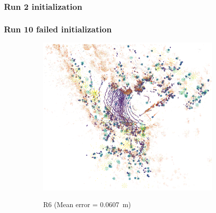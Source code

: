 \subsubsection{Run 2 initialization}
\label{sec:laverdiere_fail}

\lightlipsum[1]

\subsubsection{Run 10 failed initialization}
\label{sec:laverdiere_fail}

\lightlipsum[1]

\begin{figure}[tpbh!]
	\begin{center}
		\begin{subfigure}[b]{0.3\textwidth}
			\includegraphics[width=\linewidth]{figs/run10_init_fail/run_6.pdf}
			\label{fig:r6_pcl}
			\caption{R6 (Mean error = \SI{0.0607}{m})}
			\vspace{0.2in}
		\end{subfigure}%
		~
		\begin{subfigure}[b]{0.3\textwidth}

\end{subfigure}
\end{center}
\end{figure}
